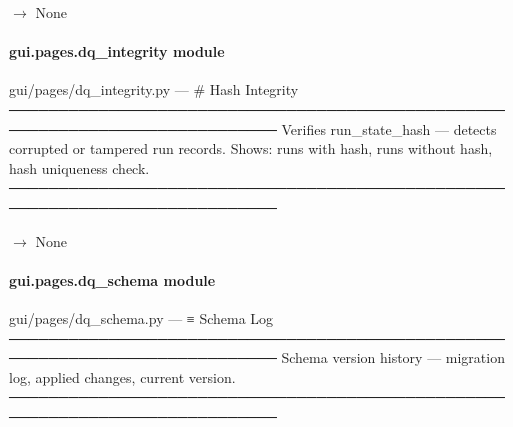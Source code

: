 \documentclass[letterpaper,10pt,english]{sphinxmanual}
\begin{document}
\begin{fulllineitems}
\label{\detokenize{gui.pages.dq_coverage:gui.pages.dq_coverage.render}}
\pysigstartsignatures
\pysiglinewithargsret
{}
{}
{{ $\rightarrow$ None}}
\pysigstopsignatures
\end{fulllineitems}


\sphinxstepscope


\paragraph{gui.pages.dq\_integrity module}
\label{\detokenize{gui.pages.dq_integrity:module-gui.pages.dq_integrity}}\label{\detokenize{gui.pages.dq_integrity:gui-pages-dq-integrity-module}}\label{\detokenize{gui.pages.dq_integrity::doc}}
\sphinxAtStartPar
gui/pages/dq\_integrity.py  —  \#  Hash Integrity
─────────────────────────────────────────────────────────────────────────────
Verifies run\_state\_hash — detects corrupted or tampered run records.
Shows: runs with hash, runs without hash, hash uniqueness check.
─────────────────────────────────────────────────────────────────────────────

\begin{fulllineitems}
\label{\detokenize{gui.pages.dq_integrity:gui.pages.dq_integrity.render}}
\pysigstartsignatures
\pysiglinewithargsret
{}
{}
{{ $\rightarrow$ None}}
\pysigstopsignatures
\end{fulllineitems}


\sphinxstepscope


\paragraph{gui.pages.dq\_schema module}
\label{\detokenize{gui.pages.dq_schema:module-gui.pages.dq_schema}}\label{\detokenize{gui.pages.dq_schema:gui-pages-dq-schema-module}}\label{\detokenize{gui.pages.dq_schema::doc}}
\sphinxAtStartPar
gui/pages/dq\_schema.py  —  ≡  Schema Log
─────────────────────────────────────────────────────────────────────────────
Schema version history — migration log, applied changes, current version.
─────────────────────────────────────────────────────────────────────────────
\end{document}

